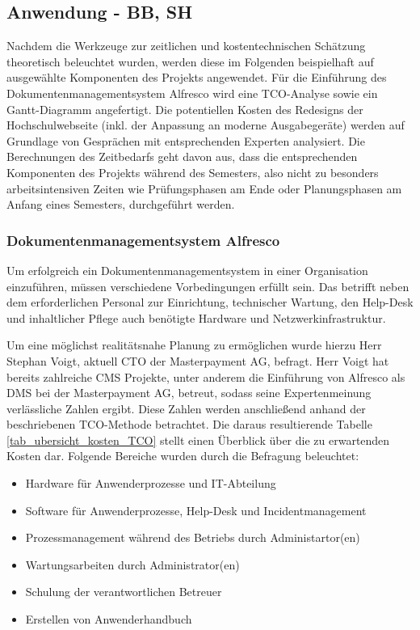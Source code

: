 
\subsection{Anwendung - BB, SH}

\label{kosten_zeit_anwendung} %
Nachdem die Werkzeuge zur zeitlichen und kostentechnischen Schätzung theoretisch beleuchtet wurden, werden diese im Folgenden beispielhaft auf ausgewählte Komponenten des Projekts angewendet. Für die Einführung des Dokumentenmanagementsystem Alfresco wird eine TCO-Analyse sowie ein Gantt-Diagramm angefertigt. Die potentiellen Kosten des Redesigns der Hochschulwebseite (inkl. der Anpassung  an moderne Ausgabegeräte) werden auf Grundlage von Gesprächen mit entsprechenden Experten analysiert. Die Berechnungen des Zeitbedarfs geht davon aus, dass die entsprechenden Komponenten des Projekts während des Semesters, also nicht zu besonders arbeitsintensiven Zeiten wie Prüfungsphasen am Ende oder Planungsphasen am Anfang eines Semesters, durchgeführt werden.

\subsubsection{Dokumentenmanagementsystem Alfresco}
\label{subsubsection_dokusystem_alfresco}
Um erfolgreich ein Dokumentenmanagementsystem in einer Organisation einzuführen, müssen verschiedene Vorbedingungen erfüllt sein. Das betrifft neben dem erforderlichen Personal zur Einrichtung, technischer Wartung, den Help-Desk und inhaltlicher Pflege auch benötigte Hardware und Netzwerkinfrastruktur.

Um eine möglichst realitätsnahe Planung zu ermöglichen wurde hierzu Herr Stephan Voigt, aktuell CTO der Masterpayment AG, befragt. Herr Voigt hat bereits zahlreiche CMS Projekte, unter anderem die Einführung von Alfresco als DMS bei der Masterpayment AG, betreut, sodass seine Expertenmeinung verlässliche Zahlen ergibt. Diese Zahlen werden anschließend anhand der beschriebenen TCO-Methode betrachtet. Die daraus resultierende Tabelle \ref{tab_ubersicht_kosten_TCO} stellt einen Überblick über die zu erwartenden Kosten dar. Folgende Bereiche wurden durch die Befragung beleuchtet:

\begin{itemize}
	\item Hardware für Anwenderprozesse und IT-Abteilung
	\item Software für Anwenderprozesse, Help-Desk und Incidentmanagement
	\item Prozessmanagement während des Betriebs durch Administartor(en)
	\item Wartungsarbeiten durch Administrator(en)
	\item Schulung der verantwortlichen Betreuer
	\item Erstellen von Anwenderhandbuch
\end{itemize}

